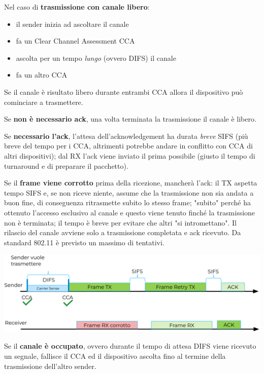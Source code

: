 Nel caso di \textbf{trasmissione con canale libero}:
\begin{itemize}
	\item il sender inizia ad ascoltare il canale
	
    \item fa un Clear Channel Assessment CCA
	
    \item ascolta per un tempo \textit{lungo} (ovvero DIFS) il canale
	
    \item fa un altro CCA
\end{itemize}

Se il canale è risultato libero durante entrambi CCA allora il dispositivo può cominciare a trasmettere.

Se \textbf{non è necessario ack}, una volta terminata la trasmissione il canale è libero.

Se \textbf{necessario l'ack}, l'attesa dell'acknowledgement ha durata \textit{breve} SIFS (più breve del tempo per i CCA, altrimenti potrebbe andare in conflitto con CCA di altri dispositivi); dal RX l'ack viene inviato il prima possibile (giusto il tempo di turnaround e di preparare il pacchetto).

Se il \textbf{frame viene corrotto} prima della ricezione, mancherà l'ack: il TX aspetta tempo SIFS e, se non riceve niente, assume che la trasmissione non sia andata a buon fine, di conseguenza ritrasmette subito lo stesso frame; "subito" perché ha ottenuto l'accesso esclusivo al canale e questo viene tenuto finché la trasmissione non è terminata; il tempo è breve per evitare che altri "si intromettano". Il rilascio del canale avviene solo a trasmissione completata e ack ricevuto. Da standard 802.11 è previsto un massimo di tentativi.
\begin{center}
	\includegraphics[width=0.98\linewidth]{img/wlan/dcfcsmaca}
\end{center}

Se il \textbf{canale è occupato}, ovvero durante il tempo di attesa DIFS viene ricevuto un segnale, fallisce il CCA ed il dispositivo ascolta fino al termine della trasmissione dell'altro sender.


